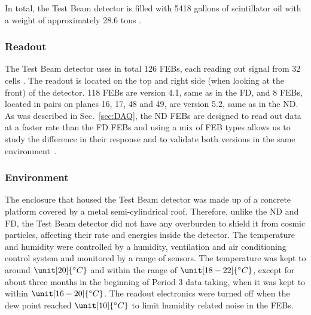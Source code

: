 
In total, the Test Beam detector is filled with 5418 gallons of scintillator oil with a weight of approximately 28.6 tons \cite{NOvA-doc-29543}.

\subsubsection*{Readout}
The Test Beam detector uses in total 126 \glspl{FEB}, each reading out signal from 32 cells \cite{NOvA-doc-29543}. The readout is located on the top and right side (when looking at the front) of the detector. 118 \glspl{FEB} are version 4.1, same as in the \gls{FD}, and 8 \glspl{FEB}, located in pairs on planes 16, 17, 48 and 49, are version 5.2, same as in the \gls{ND}. As was described in Sec.~\ref{sec:DAQ}, the \gls{ND} \glspl{FEB} are designed to read out data at a faster rate than the \gls{FD} \glspl{FEB} and using a mix of \gls{FEB} types allows us to study the difference in their response and to validate both versions in the same environment~\cite{LackeyThesisNOvATBProtons2022.pdf}.


\subsubsection*{Environment}
The enclosure that housed the Test Beam detector was made up of a concrete platform covered by a metal semi-cylindrical roof. Therefore, unlike the \gls{ND} and \gls{FD}, the Test Beam detector did not have any overburden to shield it from cosmic particles, affecting their rate and energies inside the detector. The temperature and humidity were controlled by a humidity, ventilation and air conditioning control system and monitored by a range of sensors. The temperature was kept to around $\unit[20]{^{\circ}C}$ and within the range of $\unit[18-22]{^{\circ}C}$, except for about three months in the beginning of Period 3 data taking, when it was kept to within $\unit[16-20]{^{\circ}C}$. The readout electronics were turned off when the dew point reached  $\unit[10]{^{\circ}C}$ to limit humidity related noise in the \glspl{FEB}.

